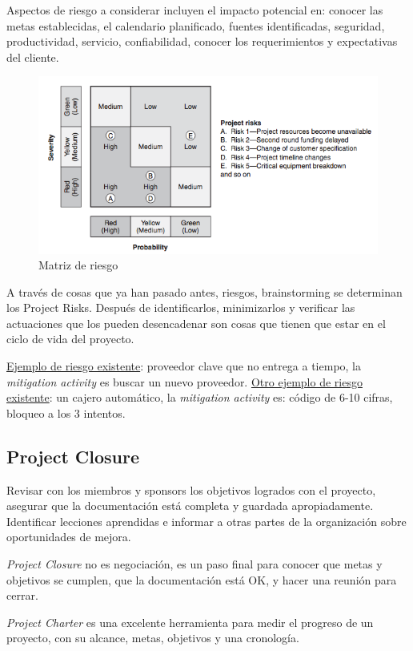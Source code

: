 \documentclass[]{article}
\begin{document}
Aspectos de riesgo a considerar incluyen el impacto potencial en: conocer las metas establecidas, el calendario planificado, fuentes identificadas, seguridad, productividad, servicio, confiabilidad, conocer los requerimientos y expectativas del cliente.

\begin{figure}[ht!]
	\centering
	\includegraphics[width=120mm]{imagenes/RiskMatrix2.png}
	\caption{Matriz de riesgo}
	\label{fig:RiskMatrix2}
\end{figure}

A través de cosas que ya han pasado antes, riesgos, brainstorming se determinan los Project Risks. Después de identificarlos, minimizarlos y verificar las actuaciones que los pueden desencadenar son cosas que tienen que estar en el ciclo de vida del proyecto. 

\underline{Ejemplo de riesgo existente}: proveedor clave que no entrega a tiempo, la \textit{mitigation activity} es buscar un nuevo proveedor.
\underline{Otro ejemplo de riesgo existente}: un cajero automático, la \textit{mitigation activity} es: código de 6-10 cifras, bloqueo a los 3 intentos.

\subsection{Project Closure}

Revisar con los miembros y sponsors los objetivos logrados con el proyecto, asegurar que la documentación está completa y guardada apropiadamente. Identificar lecciones aprendidas e informar a otras partes de la organización sobre oportunidades de mejora.

\textit{Project Closure} no es negociación, es un paso final para conocer que metas y objetivos se cumplen, que la documentación está OK, y hacer una reunión para cerrar.

\textit{Project Charter} es una excelente herramienta para medir el progreso de un proyecto, con su alcance, metas, objetivos y una cronología.
\end{document}
